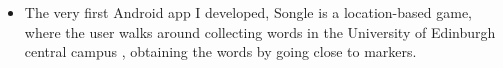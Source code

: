 \documentclass[9pt,a4paper]{altacv}
\begin{document}
\begin{itemize}
\item The very first Android app I developed, Songle is a location-based game, where the user walks around collecting words in the University of Edinburgh central campus , obtaining the words by going close to markers.

\end{itemize}
\end{document}
